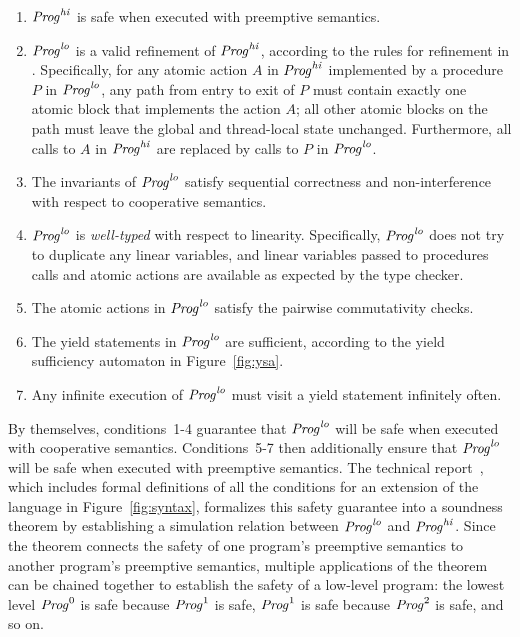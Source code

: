 \begin{enumerate}
\item
$\mathit{Prog}^{\mathit{hi}}$ is safe when executed with preemptive semantics.
\item
$\mathit{Prog}^{\mathit{lo}}$ is a valid refinement of $\mathit{Prog}^{\mathit{hi}}$, according to the rules for refinement in \civl.
Specifically, for any atomic action $A$ in $\mathit{Prog}^{\mathit{hi}}$ implemented by a procedure $P$ in $\mathit{Prog}^{\mathit{lo}}$,
any path from entry to exit of $P$ must contain exactly one atomic block that implements the action $A$;
all other atomic blocks on the path must leave the global and thread-local state unchanged.
Furthermore, all calls to $A$ in $\mathit{Prog}^{\mathit{hi}}$ are replaced by calls to $P$ in $\mathit{Prog}^{\mathit{lo}}$.
\item
The invariants of $\mathit{Prog}^{\mathit{lo}}$ satisfy sequential correctness and non-interference with respect to cooperative semantics.
\item
$\mathit{Prog}^{\mathit{lo}}$ is {\em well-typed} with respect to linearity.
Specifically, $\mathit{Prog}^{\mathit{lo}}$ does not try to duplicate any linear variables,
and linear variables passed to procedures calls and atomic actions are available
as expected by the type checker.
\item
The atomic actions in $\mathit{Prog}^{\mathit{lo}}$ satisfy the pairwise commutativity checks.
\item
The yield statements in $\mathit{Prog}^{\mathit{lo}}$ are sufficient, according to the yield sufficiency automaton in Figure~\ref{fig:ysa}.
\item
Any infinite execution of $\mathit{Prog}^{\mathit{lo}}$ must visit a yield statement infinitely often.
\end{enumerate}

By themselves, conditions~1-4 guarantee that $\mathit{Prog}^{\mathit{lo}}$ will be safe when executed with cooperative semantics.
Conditions~5-7 then additionally ensure that $\mathit{Prog}^{\mathit{lo}}$ will be safe when executed with preemptive semantics.
The technical report~\cite{gc-techreport},
which includes formal definitions of all the conditions for an extension of the language in Figure~\ref{fig:syntax},
formalizes this safety guarantee into a soundness theorem by establishing a simulation relation between $\mathit{Prog}^{\mathit{lo}}$ and $\mathit{Prog}^{\mathit{hi}}$.
Since the theorem connects the safety of one program's preemptive semantics to another program's preemptive semantics,
multiple applications of the theorem can be chained together to establish the safety of a low-level program:
the lowest level $\mathit{Prog}^0$ is safe because $\mathit{Prog}^1$ is safe, $\mathit{Prog}^1$ is safe because $\mathit{Prog}^2$ is safe, and so on.


